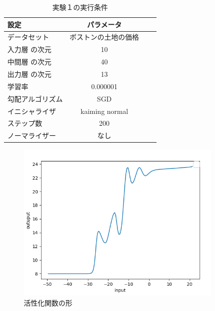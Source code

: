 \begin{table}[htbp]
    \begin{center}
        \caption{実験１の実行条件}
        \vspace{5mm} 
        \begin{tabular}{l*{2}{c}r}
        設定              & パラメータ \\
        \hline
        データセット            & ボストンの土地の価格 \\
        入力層 の次元            & 10 \\
        中間層 の次元            & 40 \\
        出力層 の次元            & 13 \\
        学習率              & 0.000001 \\
        勾配アルゴリズム       & SGD \\
        イニシャライザ               & kaiming normal \\
        ステップ数        & 200 \\
        ノーマライザー           & なし \\
        \end{tabular}
    \end{center}
\end{table}


\begin{figure}[hbtp]
    \begin{center}
        \includegraphics[width=10cm]{asset/boston_0000001_SGDkaiming_normal__non_200_function_2.png}
            \caption{活性化関数の形}
            \label{boston}
    \end{center}
\end{figure}


